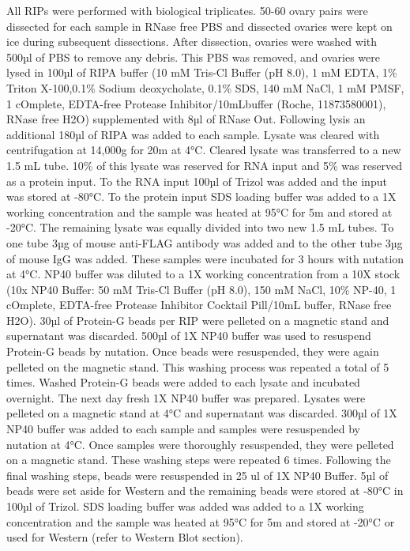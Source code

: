 \documentclass[12pt,oneside]{reedthesis}
\begin{document}
All RIPs were performed with biological triplicates. 50-60 ovary pairs were dissected for each sample in RNase free PBS and dissected ovaries were kept on ice during subsequent dissections. After dissection, ovaries were washed with 500µl of PBS to remove any debris. This PBS was removed, and ovaries were lysed in 100µl of RIPA buffer (10 mM Tris-Cl Buffer (pH 8.0), 1 mM EDTA, 1\% Triton X-100,0.1\% Sodium deoxycholate, 0.1\% SDS, 140 mM NaCl, 1 mM PMSF, 1 cOmplete, EDTA-free Protease Inhibitor/10mLbuffer (Roche, 11873580001), RNase free H2O) supplemented with 8µl of RNase Out. Following lysis an additional 180µl of RIPA was added to each sample. Lysate was cleared with centrifugation at 14,000g for 20m at 4°C. Cleared lysate was transferred to a new 1.5 mL tube. 10\% of this lysate was reserved for RNA input and 5\% was reserved as a protein input. To the RNA input 100µl of Trizol was added and the input was stored at -80°C. To the protein input SDS loading buffer was added to a 1X working concentration and the sample was heated at 95°C for 5m and stored at -20°C. The remaining lysate was equally divided into two new 1.5 mL tubes. To one tube 3µg of mouse anti-FLAG antibody was added and to the other tube 3µg of mouse IgG was added. These samples were incubated for 3 hours with nutation at 4°C. NP40 buffer was diluted to a 1X working concentration from a 10X stock (10x NP40 Buffer: 50 mM Tris-Cl Buffer (pH 8.0), 150 mM NaCl, 10\% NP-40, 1 cOmplete, EDTA-free Protease Inhibitor Cocktail Pill/10mL buffer, RNase free H2O). 30µl of Protein-G beads per RIP were pelleted on a magnetic stand and supernatant was discarded. 500µl of 1X NP40 buffer was used to resuspend Protein-G beads by nutation. Once beads were resuspended, they were again pelleted on the magnetic stand. This washing process was repeated a total of 5 times. Washed Protein-G beads were added to each lysate and incubated overnight. The next day fresh 1X NP40 buffer was prepared. Lysates were pelleted on a magnetic stand at 4°C and supernatant was discarded. 300µl of 1X NP40 buffer was added to each sample and samples were resuspended by nutation at 4°C. Once samples were thoroughly resuspended, they were pelleted on a magnetic stand. These washing steps were repeated 6 times. Following the final washing steps, beads were resuspended in 25 ul of 1X NP40 Buffer. 5µl of beads were set aside for Western and the remaining beads were stored at -80°C in 100µl of Trizol. SDS loading buffer was added was added to a 1X working concentration and the sample was heated at 95°C for 5m and stored at -20°C or used for Western (refer to Western Blot section).
\end{document}
